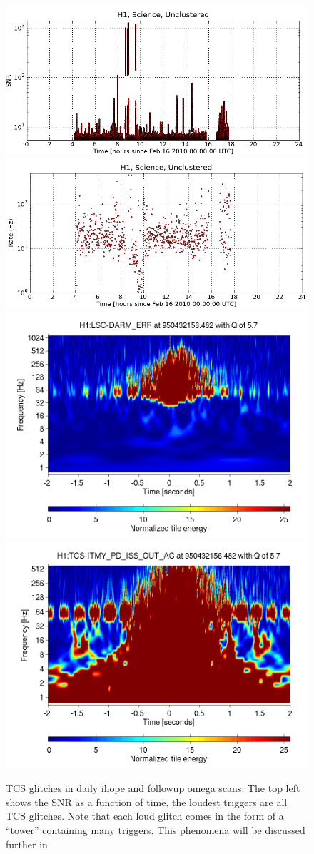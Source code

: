 \begin{figure}
  \includegraphics[width=0.5\linewidth]{figures/detchar/20100217_H1_0_UNCLUSTERED_snr_vs_time} 
  \includegraphics[width=0.5\linewidth]{figures/detchar/20100217_H1_0_UNCLUSTERED_rate_vs_time} \\
  \includegraphics[width=0.5\linewidth]{figures/detchar/950432156_482177734_H1_LSC-DARM_ERR_4_00_spectrogram_whitened}
  \includegraphics[width=0.5\linewidth]{figures/detchar/950432156_482177734_H1_TCS-ITMY_PD_ISS_OUT_AC_4_00_spectrogram_whitened}
  \caption[TCS glitch in daily ihope and omega]{
  \label{f:daily_ihope_tcs}
TCS glitches in daily ihope and followup omega scans.  The top left
shows the SNR as a function of time, the loudest triggers are all TCS
glitches.  Note that each loud glitch comes in the form of a ``tower''
containing many triggers.  This phenomena will be discussed further in
}
\end{figure}
